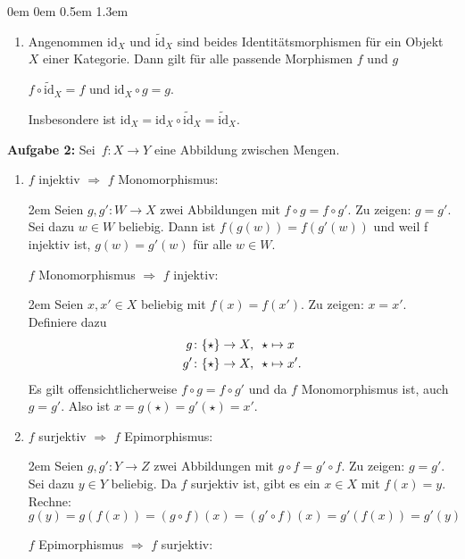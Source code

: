 \documentclass[a4paper,ngerman]{scrartcl}
\theoremstyle{definition}
\theoremstyle{plain}
\theoremstyle{remark}
\newcommand{\id}{\mathrm{id}}
\begin{document}
\begin{list}{}{0em \leftmargin0em \itemindent0.5em \itemsep 1.3em}
\begin{enumerate}
\item Angenommen $\id_X$ und $\widetilde{\id}_X$ sind beides Identitätsmorphismen für ein Objekt~$X$ einer Kategorie. Dann gilt für alle passende Morphismen $f$ und $g$

  $f \circ \widetilde{\id}_X = f$ und $\id_X \circ g = g$.

  Insbesondere ist $\id_X = \id_X \circ \widetilde{\id}_X = \widetilde{\id}_X$.
\end{enumerate}

\item[\textbf{Aufgabe 2:}]
Sei~$f:X \to Y$ eine Abbildung zwischen Mengen.
\begin{enumerate}
\item $f$ injektiv $\Rightarrow$ $f$ Monomorphismus:

  \begin{addmargin}{2em}
    Seien $g, g':W \to X$ zwei Abbildungen mit $f \circ g = f \circ g'$. Zu zeigen: $g = g'$.
    Sei dazu $w \in W$ beliebig. Dann ist $f(g(w)) = f(g'(w))$ und weil f injektiv ist,
    $g(w) = g'(w)$ für alle $w \in W$.
  \end{addmargin}

  $f$ Monomorphismus $\Rightarrow$ $f$ injektiv:

  \begin{addmargin}{2em}
    Seien $x, x' \in X$ beliebig mit $f(x) = f(x')$. Zu zeigen: $x = x'$. Definiere dazu
    \begin{align*}
      g &\colon\{\star\} \to X, \enskip\star \mapsto x \\
      g' &\colon\{\star\} \to X, \enskip\star \mapsto x'.
    \end{align*}
    Es gilt offensichtlicherweise $f \circ g = f \circ g'$ und da $f$ Monomorphismus ist,
    auch $g = g'$. Also ist $x = g(\star) = g'(\star) = x'$.
  \end{addmargin}

\item $f$ surjektiv $\Rightarrow$ $f$ Epimorphismus:

  \begin{addmargin}{2em}
    Seien $g, g':Y \to Z$ zwei Abbildungen mit $g \circ f = g' \circ f$. Zu zeigen: $g = g'$.
    Sei dazu $y \in Y$ beliebig. Da $f$ surjektiv ist, gibt es ein $x \in X$ mit $f(x) = y$. Rechne:
    $$g(y) = g(f(x)) = (g \circ f)(x) = (g' \circ f)(x) = g'(f(x)) = g'(y)$$
  \end{addmargin}

  $f$ Epimorphismus $\Rightarrow$ $f$ surjektiv:


\end{enumerate}
\end{list}
\end{document}
